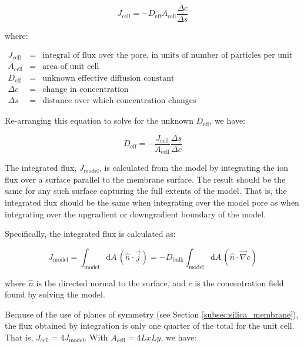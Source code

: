 \begin{equation}\label{eq:Deff_Jcell}
J_{\mathrm{cell}} = - D_{\mathrm{eff}} A_{\mathrm{cell}} \frac{\Delta c}{\Delta s}
\end{equation}

where:

$\begin{array}{rcl}
J_{\text{cell}} & = & \text{integral of flux over the pore, in units of number of particles per unit time} \\
A_{\text{cell}} & = & \text{area of unit cell} \\
D_{\text{eff}} & = & \text{unknown effective diffusion constant} \\
\Delta c & = & \text{change in concentration} \\
\Delta s & = & \text{distance over which concentration changes}
\end{array}$

Re-arranging this equation to solve for the unknown $D_{\mathrm{eff}}$, we have:

\begin{equation}\label{eq:Deff_def}
D_{\mathrm{eff}} = - \frac{J_{\mathrm{cell}}}{A_{\mathrm{cell}}} \frac{\Delta s}{\Delta c}
\end{equation}

The integrated flux, $J_{\mathrm{model}}$, is calculated from the model by integrating
the ion flux over a surface parallel to the membrane surface.
The result should be the same for any such surface capturing the full extents of the model.
That is, the integrated flux should be the same when integrating over the model pore as
when integrating over the upgradient or downgradient boundary of the model.

Specifically, the integrated flux is calculated as:

\begin{equation}
J_{\mathrm{model}} = \int_{\mathrm{model}} \mathrm{d}A\, \left(\hat{n} \cdot \vec{j} \right)
 = - D_{\mathrm{bulk}} \int_{\mathrm{model}} \mathrm{d}A\, \left(\hat{n} \cdot \vec{\nabla} c \right)
\end{equation}

where $\hat{n}$ is the directed normal to the surface,
and $c$ is the concentration field found by solving the model.

Because of the use of planes of symmetry (see Section \ref{subsec:silica_membrane}),
the flux obtained by integration is only one quarter of the total for the unit cell.
That is, $J_{\mathrm{cell}} = 4 J_{\mathrm{model}}$.
With $A_{\mathrm{cell}} = 4 Lx Ly$, we have:

